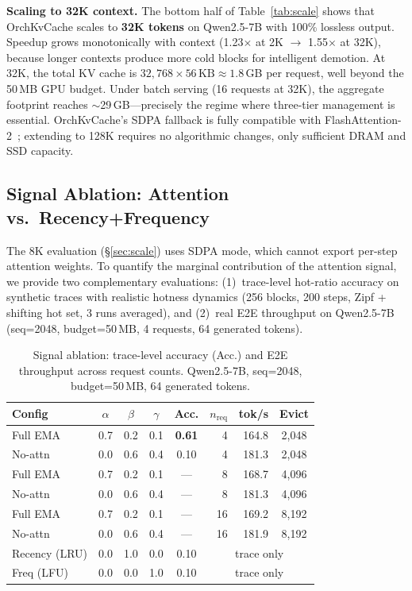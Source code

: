 \documentclass[conference]{IEEEtran}
\begin{document}
\textbf{Scaling to 32K context.} The bottom half of Table~\ref{tab:scale} shows that OrchKvCache scales to \textbf{32K tokens} on Qwen2.5-7B with 100\% lossless output. Speedup grows monotonically with context (1.23$\times$ at 2K $\to$ 1.55$\times$ at 32K), because longer contexts produce more cold blocks for intelligent demotion. At 32K, the total KV cache is $32{,}768 \times 56\,\text{KB} \approx 1.8$\,GB per request, well beyond the 50\,MB GPU budget. Under batch serving (16 requests at 32K), the aggregate footprint reaches ${\sim}$29\,GB---precisely the regime where three-tier management is essential. OrchKvCache's SDPA fallback is fully compatible with FlashAttention-2~\cite{flashattn2}; extending to 128K requires no algorithmic changes, only sufficient DRAM and SSD capacity.

\subsection{Signal Ablation: Attention vs.\ Recency+Frequency}
\label{sec:signal-ablation}

The 8K evaluation (\S\ref{sec:scale}) uses SDPA mode, which cannot export per-step attention weights. To quantify the marginal contribution of the attention signal, we provide two complementary evaluations: (1)~trace-level hot-ratio accuracy on synthetic traces with realistic hotness dynamics (256 blocks, 200 steps, Zipf + shifting hot set, 3 runs averaged), and (2)~real E2E throughput on Qwen2.5-7B (seq=2048, budget=50\,MB, 4 requests, 64 generated tokens).

\begin{table}[t]
\centering
\caption{Signal ablation: trace-level accuracy (Acc.) and E2E throughput across request counts. Qwen2.5-7B, seq=2048, budget=50\,MB, 64 generated tokens.}
\label{tab:signal-ablation}
\small
\setlength{\tabcolsep}{4pt}
\begin{tabular}{@{}lccccrrc@{}}
\toprule
Config & $\alpha$ & $\beta$ & $\gamma$ & Acc. & $n_\text{req}$ & tok/s & Evict \\
\midrule
Full EMA       & 0.7 & 0.2 & 0.1 & \textbf{0.61} & 4  & 164.8 & 2{,}048 \\
No-attn        & 0.0 & 0.6 & 0.4 & 0.10          & 4  & 181.3 & 2{,}048 \\
\midrule
Full EMA       & 0.7 & 0.2 & 0.1 & ---           & 8  & 168.7 & 4{,}096 \\
No-attn        & 0.0 & 0.6 & 0.4 & ---           & 8  & 181.3 & 4{,}096 \\
\midrule
Full EMA       & 0.7 & 0.2 & 0.1 & ---           & 16 & 169.2 & 8{,}192 \\
No-attn        & 0.0 & 0.6 & 0.4 & ---           & 16 & 181.9 & 8{,}192 \\
\midrule
Recency (LRU)  & 0.0 & 1.0 & 0.0 & 0.10 & \multicolumn{3}{c}{trace only} \\
Freq (LFU)     & 0.0 & 0.0 & 1.0 & 0.10 & \multicolumn{3}{c}{trace only} \\
\bottomrule
\end{tabular}
\end{table}
\end{document}
